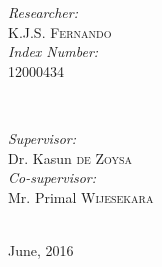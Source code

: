 \begin{titlepage}
\begin{minipage}{0.4\textwidth}
\begin{flushleft} \large
\emph{Researcher:}\\
K.J.S. \textsc{Fernando}\\ %
\emph{Index Number:}\\
12000434
\end{flushleft}
\end{minipage}
~
\begin{minipage}{0.4\textwidth}
\begin{flushright} \large
\emph{Supervisor:} \\
Dr. Kasun \textsc{de Zoysa}\\ %
\emph{Co-supervisor:} \\
Mr. Primal \textsc{Wijesekara}
\end{flushright}
\end{minipage}\\[2cm]

{\large June, 2016} %


\vfill %

\end{titlepage}


\tableofcontents

\mainmatter




